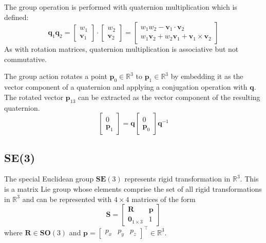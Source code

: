 		The group operation is performed with quaternion multiplication which is defined:
		\begin{equation}
			\mathbf{q}_1\mathbf{q}_2 =
			\begin{bmatrix}
			 	w_1 \\
			 	\mathbf{v}_1
			\end{bmatrix} 
			\cdot
			\begin{bmatrix}
			 	w_2 \\
			 	\mathbf{v}_2
			\end{bmatrix} 
			=
			\begin{bmatrix}
			 	w_1w_2 - \mathbf{v}_1 \cdot \mathbf{v}_2 \\
			 	w_1\mathbf{v}_2 + w_2\mathbf{v}_1 + \mathbf{v}_1 \times \mathbf{v}_2
			\end{bmatrix} 
		\end{equation} 
		As with rotation matrices, quaternion multiplication is associative but not commutative.
		
		The group action rotates a point $\mathbf{p}_0 \in \mathbb{R}^3$  to $\mathbf{p}_1 \in \mathbb{R}^3$ by embedding it as the vector component of a quaternion and applying a conjugation operation with $\mathbf{q}$. The rotated vector $\mathbf{p}_13$ can be extracted as the vector component of the resulting quaternion.
		\begin{equation} \label{quatrot}
			\begin{bmatrix}
			 	0\\
			 	\mathbf{p}_1
			\end{bmatrix}
			= \mathbf{q}
			\begin{bmatrix}
			 	0\\
			 	\mathbf{p}_0
			\end{bmatrix}
			\mathbf{q}^{-1}
		\end{equation}
		
	\subsection{\textbf{SE}(3)}	
		The special Euclidean group $\textbf{SE}(3)$ represents rigid transformation in $\mathbb{R}^3$. This is a matrix Lie group whose elements comprise the set of all rigid transformations in $\mathbb{R}^3$ and can be represented with $4 \times 4$ matrices of the form
		\begin{equation}
			\textbf{S} = 
			\begin{bmatrix}
				  \mathbf{R}	&	\mathbf{p} \\
				  \textbf{0}_{1 \times 3}		& 	1 
			\end{bmatrix}
		\end{equation}
		where $\mathbf{R} \in \mathbf{SO}(3)$ and 
		$\mathbf{p} = 
		\begin{bmatrix}
			p_x	& p_y & p_z				
		\end{bmatrix}
		^\top \in \mathbb{R}^3$.
		
